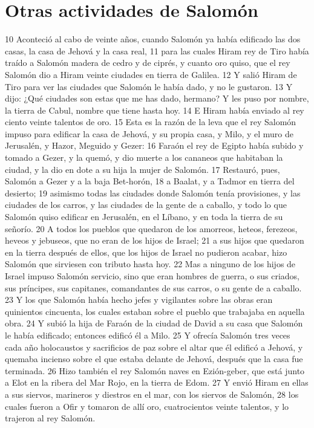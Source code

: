 \section*{Otras actividades de Salomón}

10 Aconteció al cabo de veinte años, cuando Salomón ya había edificado las dos casas, la casa de Jehová y la casa real,
11 para las cuales Hiram rey de Tiro había traído a Salomón madera de cedro y de ciprés, y cuanto oro quiso, que el rey Salomón dio a Hiram veinte ciudades en tierra de Galilea.
12 Y salió Hiram de Tiro para ver las ciudades que Salomón le había dado, y no le gustaron.
13 Y dijo: ¿Qué ciudades son estas que me has dado, hermano? Y les puso por nombre, la tierra de Cabul, nombre que tiene hasta hoy.
14 E Hiram había enviado al rey ciento veinte talentos   de oro.
15 Esta es la razón de la leva que el rey Salomón impuso para edificar la casa de Jehová, y su propia casa, y Milo, y el muro de Jerusalén, y Hazor, Meguido y Gezer:
16 Faraón el rey de Egipto había subido y tomado a Gezer, y la quemó, y dio muerte a los cananeos que habitaban la ciudad, y la dio en dote a su hija la mujer de Salomón.
17 Restauró, pues, Salomón a Gezer y a la baja Bet-horón,
18 a Baalat, y a Tadmor en tierra del desierto;
19 asimismo todas las ciudades donde Salomón tenía provisiones, y las ciudades de los carros, y las ciudades de la gente de a caballo, y todo lo que Salomón quiso edificar en Jerusalén, en el Líbano, y en toda la tierra de su señorío.
20 A todos los pueblos que quedaron de los amorreos, heteos, ferezeos, heveos y jebuseos, que no eran de los hijos de Israel;
21 a sus hijos que quedaron en la tierra después de ellos, que los hijos de Israel no pudieron acabar, hizo Salomón que sirviesen con tributo hasta hoy.
22 Mas a ninguno de los hijos de Israel impuso Salomón servicio, sino que eran hombres de guerra, o sus criados, sus príncipes, sus capitanes, comandantes de sus carros, o su gente de a caballo.
23 Y los que Salomón había hecho jefes y vigilantes sobre las obras eran quinientos cincuenta, los cuales estaban sobre el pueblo que trabajaba en aquella obra.
24 Y subió la hija de Faraón de la ciudad de David a su casa que Salomón le había edificado; entonces edificó él a Milo.
25 Y ofrecía Salomón tres veces cada año holocaustos y sacrificios de paz sobre el altar que él edificó a Jehová, y quemaba incienso sobre el que estaba delante de Jehová, después que la casa fue terminada.
26 Hizo también el rey Salomón naves en Ezión-geber, que está junto a Elot en la ribera del Mar Rojo, en la tierra de Edom.
27 Y envió Hiram en ellas a sus siervos, marineros y diestros en el mar, con los siervos de Salomón,
28 los cuales fueron a Ofir y tomaron de allí oro, cuatrocientos veinte talentos,  y lo trajeron al rey Salomón.

